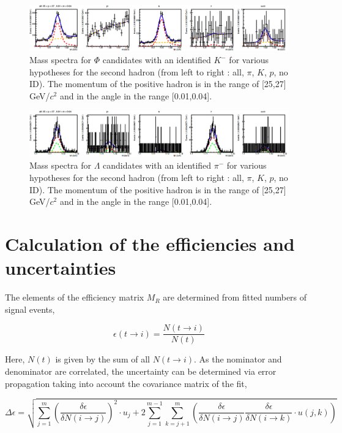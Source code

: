 \begin{figure}[!h]
  \centering
	\includegraphics[scale=0.3]{./gfx/PhiMassSpectra.png}
	\caption{Mass spectra for $\Phi$ candidates with an identified $K^-$ for various hypotheses for the second hadron (from left to right : all, $\pi$, $K$, $p$, no ID). The momentum of the positive hadron is in the range of [25,27] GeV/$c^2$ and in the angle in the range [0.01,0.04].}
	\label{pic:PhiMassSpectra}
\end{figure}

\begin{figure}[!h]
  \centering
	\includegraphics[scale=0.3]{./gfx/LambdaMassSpectra.png}
	\caption{Mass spectra for $\Lambda$ candidates with an identified $\pi^-$ for various hypotheses for the second hadron (from left to right : all, $\pi$, $K$, $p$, no ID). The momentum of the positive hadron is in the range of [25,27] GeV/$c^2$ and in the angle in the range [0.01,0.04].}
	\label{pic:LambdaMassSpectra}
\end{figure}

\section{Calculation of the efficiencies and uncertainties}

The elements of the efficiency matrix $M_R$ are determined from fitted numbers of signal events,

\begin{equation}
  \epsilon(t\rightarrow i) = \frac{N(t\rightarrow i)}{N(t)}
\end{equation}

Here, $N(t)$ is given by the sum of all $N(t \rightarrow i)$. As the nominator and denominator are correlated, the uncertainty can be determined via error propagation taking into account the covariance matrix of the fit,

\begin{equation}
  \Delta \epsilon = \sqrt{\sum_{j=1}^m \left( \frac{\delta \epsilon}{\delta N(i\rightarrow j)} \right)^2 \cdot u_j + 2 \sum_{j=1}^{m-1} \sum_{k=j+1}^{m} \left( \frac{\delta \epsilon}{\delta N(i\rightarrow j)} \frac{\delta \epsilon}{\delta N(i\rightarrow k)} \cdot u(j,k) \right)}
\end{equation}

